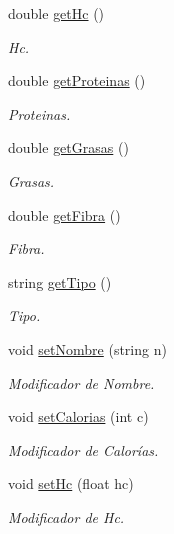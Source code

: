 \begin{DoxyCompactItemize}
double \hyperlink{classingrediente_abb195921a716feed48c16f6aa5729218}{get\+Hc} ()
\begin{DoxyCompactList}\small\item\em Hc. \end{DoxyCompactList}\item 
double \hyperlink{classingrediente_aa6252c91568acf58332ec1a7202cd1c4}{get\+Proteinas} ()
\begin{DoxyCompactList}\small\item\em Proteinas. \end{DoxyCompactList}\item 
double \hyperlink{classingrediente_a2e5b063794ee06868067df52ad35a23c}{get\+Grasas} ()
\begin{DoxyCompactList}\small\item\em Grasas. \end{DoxyCompactList}\item 
double \hyperlink{classingrediente_a2477818722228f8b674a9ddd9e6743e7}{get\+Fibra} ()
\begin{DoxyCompactList}\small\item\em Fibra. \end{DoxyCompactList}\item 
string \hyperlink{classingrediente_a52fe74f041eba65a8c0a2e006a7686e0}{get\+Tipo} ()
\begin{DoxyCompactList}\small\item\em Tipo. \end{DoxyCompactList}\item 
void \hyperlink{classingrediente_aac5aba3c36aa762c72a8bc38271e4c12}{set\+Nombre} (string n)
\begin{DoxyCompactList}\small\item\em Modificador de Nombre. \end{DoxyCompactList}\item 
void \hyperlink{classingrediente_ad58c1fc3e923d2ab95fdacd779c4f4e5}{set\+Calorias} (int c)
\begin{DoxyCompactList}\small\item\em Modificador de Calorías. \end{DoxyCompactList}\item 
void \hyperlink{classingrediente_ad335883ec2bbe4e02cc6422c503944e3}{set\+Hc} (float hc)
\begin{DoxyCompactList}\small\item\em Modificador de Hc. \end{DoxyCompactList}\item 

\end{DoxyCompactItemize}

